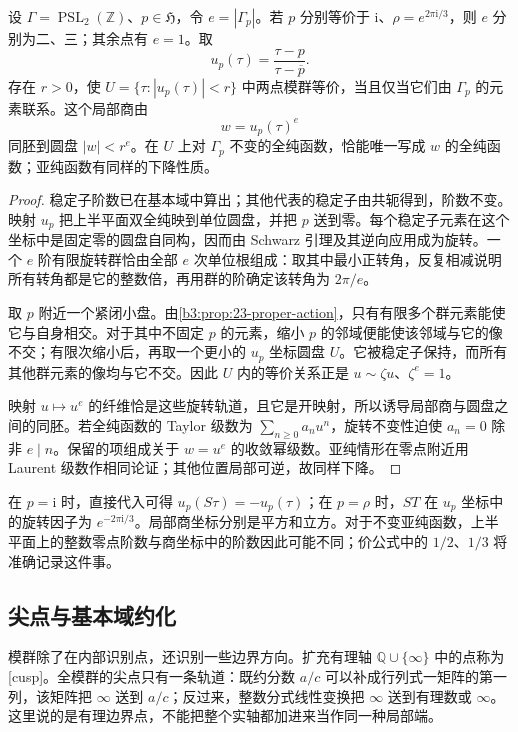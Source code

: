 \begin{proposition}[固定点附近的商坐标]\label{b3:prop:23-stabilizer-chart}
设 \(\Gamma=\operatorname{PSL}_2(\mathbb Z)\)、\(p\in\mathfrak H\)，令 \(e=|\Gamma_p|\)。若 \(p\) 分别等价于 \(\mathrm{i}\)、\(\rho=e^{2\pi\mathrm{i}/3}\)，则 \(e\) 分别为二、三；其余点有 \(e=1\)。取
\[
 u_p(\tau)=\frac{\tau-p}{\tau-\overline p}.
\]
存在 \(r>0\)，使 \(U=\{\tau:|u_p(\tau)|<r\}\) 中两点模群等价，当且仅当它们由 \(\Gamma_p\) 的元素联系。这个局部商由
\[
 w=u_p(\tau)^e
\]
同胚到圆盘 \(|w|<r^e\)。在 \(U\) 上对 \(\Gamma_p\) 不变的全纯函数，恰能唯一写成 \(w\) 的全纯函数；亚纯函数有同样的下降性质。
\end{proposition}
\begin{proof}
稳定子阶数已在基本域中算出；其他代表的稳定子由共轭得到，阶数不变。映射 \(u_p\) 把上半平面双全纯映到单位圆盘，并把 \(p\) 送到零。每个稳定子元素在这个坐标中是固定零的圆盘自同构，因而由 Schwarz 引理及其逆向应用成为旋转。一个 \(e\) 阶有限旋转群恰由全部 \(e\) 次单位根组成：取其中最小正转角，反复相减说明所有转角都是它的整数倍，再用群的阶确定该转角为 \(2\pi/e\)。

取 \(p\) 附近一个紧闭小盘。由\cref{b3:prop:23-proper-action}，只有有限多个群元素能使它与自身相交。对于其中不固定 \(p\) 的元素，缩小 \(p\) 的邻域便能使该邻域与它的像不交；有限次缩小后，再取一个更小的 \(u_p\) 坐标圆盘 \(U\)。它被稳定子保持，而所有其他群元素的像均与它不交。因此 \(U\) 内的等价关系正是 \(u\sim\zeta u\)、\(\zeta^e=1\)。

映射 \(u\mapsto u^e\) 的纤维恰是这些旋转轨道，且它是开映射，所以诱导局部商与圆盘之间的同胚。若全纯函数的 Taylor 级数为 \(\sum_{n\ge0}a_nu^n\)，旋转不变性迫使 \(a_n=0\) 除非 \(e\mid n\)。保留的项组成关于 \(w=u^e\) 的收敛幂级数。亚纯情形在零点附近用 Laurent 级数作相同论证；其他位置局部可逆，故同样下降。
\end{proof}

在 \(p=\mathrm{i}\) 时，直接代入可得 \(u_p(S\tau)=-u_p(\tau)\)；在 \(p=\rho\) 时，\(ST\) 在 \(u_p\) 坐标中的旋转因子为 \(e^{-2\pi\mathrm{i}/3}\)。局部商坐标分别是平方和立方。对于不变亚纯函数，上半平面上的整数零点阶数与商坐标中的阶数因此可能不同；价公式中的 \(1/2\)、\(1/3\) 将准确记录这件事。

\subsection{尖点与基本域约化}
\label{b3:subsec:230105}

模群除了在内部识别点，还识别一些边界方向。扩充有理轴 \(\mathbb Q\cup\{\infty\}\) 中的点称为[cusp]。全模群的尖点只有一条轨道：既约分数 \(a/c\) 可以补成行列式一矩阵的第一列，该矩阵把 \(\infty\) 送到 \(a/c\)；反过来，整数分式线性变换把 \(\infty\) 送到有理数或 \(\infty\)。这里说的是有理边界点，不能把整个实轴都加进来当作同一种局部端。


